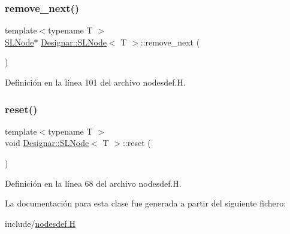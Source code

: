 \mbox{\label{class_designar_1_1_s_l_node_aa12ebd41228f87e9df06d5e74b7111e6}} 
\subsubsection{\texorpdfstring{remove\+\_\+next()}{remove\_next()}}
{\footnotesize\ttfamily template$<$typename T $>$ \\
\hyperlink{class_designar_1_1_s_l_node}{S\+L\+Node}$\ast$ \hyperlink{class_designar_1_1_s_l_node}{Designar\+::\+S\+L\+Node}$<$ T $>$\+::remove\+\_\+next (\begin{DoxyParamCaption}{ }\end{DoxyParamCaption})\hspace{0.3cm}{\ttfamily [inline]}}



Definición en la línea 101 del archivo nodesdef.\+H.

\mbox{\label{class_designar_1_1_s_l_node_ad837fcbb2d5d1fb1c7aa51392f6fdaae}} 
\subsubsection{\texorpdfstring{reset()}{reset()}}
{\footnotesize\ttfamily template$<$typename T $>$ \\
void \hyperlink{class_designar_1_1_s_l_node}{Designar\+::\+S\+L\+Node}$<$ T $>$\+::reset (\begin{DoxyParamCaption}{ }\end{DoxyParamCaption})\hspace{0.3cm}{\ttfamily [inline]}}



Definición en la línea 68 del archivo nodesdef.\+H.



La documentación para esta clase fue generada a partir del siguiente fichero\+:\begin{DoxyCompactItemize}
\item 
include/\hyperlink{nodesdef_8_h}{nodesdef.\+H}\end{DoxyCompactItemize}
